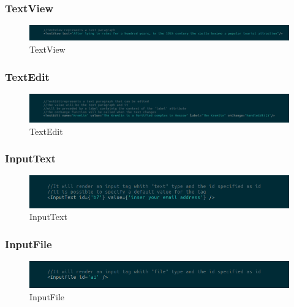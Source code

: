 \subsubsection{TextView}
\begin{figure}[H]
	\centering
	\includegraphics[width=14cm]{../../documenti/UserManualFramework/framework_view/14framework_view_textview.png}
	\caption{TextView}
\end{figure}

\subsubsection{TextEdit}
\begin{figure}[H]
	\centering
	\includegraphics[width=14cm]{../../documenti/UserManualFramework/framework_view/15framework_view_textedit.png}
	\caption{TextEdit}
\end{figure}

\subsubsection{InputText}
\begin{figure}[H]
	\centering
	\includegraphics[width=14cm]{../../documenti/UserManualFramework/framework_view/16framework_view_inputtext.png}
	\caption{InputText}
\end{figure}

\subsubsection{InputFile}
\begin{figure}[H]
	\centering
	\includegraphics[width=14cm]{../../documenti/UserManualFramework/framework_view/17framework_view_inputfile.png}
	\caption{InputFile}
\end{figure}

